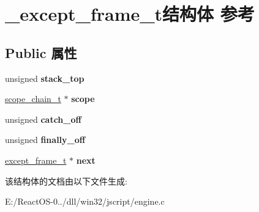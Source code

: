 \hypertarget{struct__except__frame__t}{}\section{\+\_\+except\+\_\+frame\+\_\+t结构体 参考}
\label{struct__except__frame__t}
\subsection*{Public 属性}
\begin{DoxyCompactItemize}
\item 
\mbox{\label{struct__except__frame__t_a3f3e58bae82996d60afae0761303d5b9}} 
unsigned {\bfseries stack\+\_\+top}
\item 
\mbox{\label{struct__except__frame__t_a112e5e2d79ec9ee459a6dbcf01f454a5}} 
\hyperlink{struct__scope__chain__t}{scope\+\_\+chain\+\_\+t} $\ast$ {\bfseries scope}
\item 
\mbox{\label{struct__except__frame__t_a8568a08819c8401287848498831f0242}} 
unsigned {\bfseries catch\+\_\+off}
\item 
\mbox{\label{struct__except__frame__t_aae76e072eb486ac96a34472a2b4b7462}} 
unsigned {\bfseries finally\+\_\+off}
\item 
\mbox{\label{struct__except__frame__t_a4a3a73172a1292ab51b0ac49fa8fce24}} 
\hyperlink{struct__except__frame__t}{except\+\_\+frame\+\_\+t} $\ast$ {\bfseries next}
\end{DoxyCompactItemize}


该结构体的文档由以下文件生成\+:\begin{DoxyCompactItemize}
\item 
E\+:/\+React\+O\+S-\/0../dll/win32/jscript/engine.\+c\end{DoxyCompactItemize}
